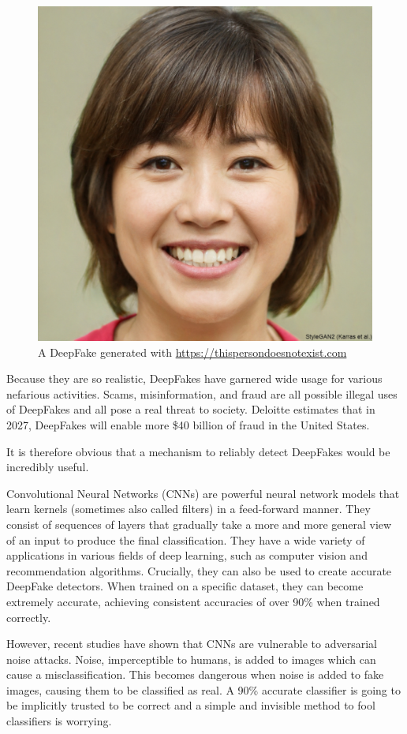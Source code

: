 \begin{figure}[h]
    \centering
    \includegraphics[width=0.5\linewidth]{dissertation//figures/thispersondoesnotexist.jpg}
    \caption{A DeepFake generated with \url{https://thispersondoesnotexist.com}}
    \label{fig:thispersondoesnotexist}
\end{figure}

Because they are so realistic, DeepFakes have garnered wide usage for various nefarious activities. Scams, misinformation, and fraud are all possible illegal uses of DeepFakes and all pose a real threat to society\cite{sensity2024state}. Deloitte estimates that in 2027, DeepFakes will enable more \$40 billion of fraud in the United States\cite{lalchand2024generative}.

It is therefore obvious that a mechanism to reliably detect DeepFakes would be incredibly useful.

Convolutional Neural Networks (CNNs) are powerful neural network models that learn kernels (sometimes also called filters) in a feed-forward manner\cite{lecun2015deep}. They consist of sequences of layers that gradually take a more and more general view of an input to produce the final classification. They have a wide variety of applications in various fields of deep learning, such as computer vision and recommendation algorithms. Crucially, they can also be used to create accurate DeepFake detectors. When trained on a specific dataset, they can become extremely accurate, achieving consistent accuracies of over 90\% when trained correctly\cite{papersiwthcodedeepfakedetection}.

However, recent studies have shown that CNNs are vulnerable to adversarial noise attacks. Noise, imperceptible to humans, is added to images which can cause a misclassification\cite{gandhi2020adversarial}. This becomes dangerous when noise is added to fake images, causing them to be classified as real. A 90\% accurate classifier is going to be implicitly trusted to be correct and a simple and invisible method to fool classifiers is worrying.

